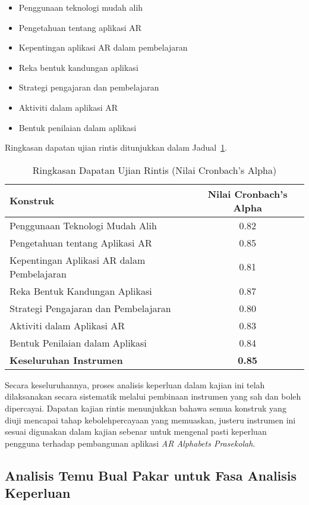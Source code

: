 \begin{itemize}
\begin{itemize}
  \item Penggunaan teknologi mudah alih
  \item Pengetahuan tentang aplikasi AR
  \item Kepentingan aplikasi AR dalam pembelajaran
  \item Reka bentuk kandungan aplikasi
  \item Strategi pengajaran dan pembelajaran
  \item Aktiviti dalam aplikasi AR
  \item Bentuk penilaian dalam aplikasi
\end{itemize}

Ringkasan dapatan ujian rintis ditunjukkan dalam Jadual~\ref{jadual:cronbachAlpha}.
\begin{table}[H]
\centering
\caption{Ringkasan Dapatan Ujian Rintis (Nilai Cronbach's Alpha)}
\label{jadual:cronbachAlpha}
\begin{tabular}{|p{8cm}|c|}
\hline
\textbf{Konstruk} & \textbf{Nilai Cronbach's Alpha} \\
\hline
Penggunaan Teknologi Mudah Alih & 0.82 \\
Pengetahuan tentang Aplikasi AR & 0.85 \\
Kepentingan Aplikasi AR dalam Pembelajaran & 0.81 \\
Reka Bentuk Kandungan Aplikasi & 0.87 \\
Strategi Pengajaran dan Pembelajaran & 0.80 \\
Aktiviti dalam Aplikasi AR & 0.83 \\
Bentuk Penilaian dalam Aplikasi & 0.84 \\
\hline
\textbf{Keseluruhan Instrumen} & \textbf{0.85} \\
\hline
\end{tabular}
\end{table}
Secara keseluruhannya, proses analisis keperluan dalam kajian ini telah dilaksanakan secara sistematik melalui pembinaan instrumen yang sah dan boleh dipercayai. Dapatan kajian rintis menunjukkan bahawa semua konstruk yang diuji mencapai tahap kebolehpercayaan yang memuaskan, justeru instrumen ini sesuai digunakan dalam kajian sebenar untuk mengenal pasti keperluan pengguna terhadap pembangunan aplikasi \textit{AR Alphabets Prasekolah}.
\subsection{Analisis Temu Bual Pakar untuk Fasa Analisis Keperluan}


\end{itemize}
